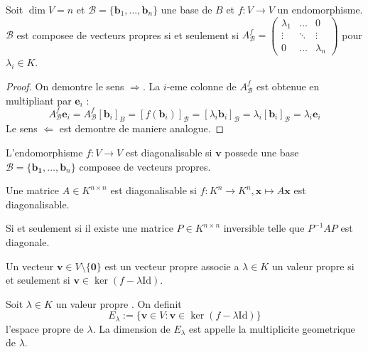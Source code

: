 \begin{lemma}
Soit $\dim V=n$ et $\mathscr{B}=\{ \boldsymbol{b}_{1},\dots,\boldsymbol{b}_{n} \}$ une base de $B$ et $f:V\to V$ un endomorphisme. $\mathscr{B}$ est composee de vecteurs propres si et seulement si $A^{f}_{\mathscr{B}}=\begin{pmatrix}\lambda_{1} & \dots & 0 \\ \vdots & \ddots & \vdots \\ 0 & \dots& \lambda _{n}\end{pmatrix}$ pour $\lambda _{i}\in K$.
\end{lemma}
\begin{proof}
On demontre le sens $\Rightarrow$. La $i$-eme colonne de $A_{\mathscr{B}}^{f}$ est obtenue en multipliant par $\boldsymbol{e}_{i}$ : $$A_{\mathscr{B}}^{f}\boldsymbol{e}_{i}=A_{\mathscr{B}}^{f}[\boldsymbol{b}_{i}]_{B}=[f(\boldsymbol{b}_{i})]_{\mathscr{B}}=[\lambda _{i}\boldsymbol{b}_{i}]_{\mathscr{B}}=\lambda _{i}[\boldsymbol{b}_{i}]_{\mathscr{B}}=\lambda _{i}\boldsymbol{e}_{i}$$
Le sens $\Leftarrow$ est demontre de maniere analogue.
\end{proof}
\begin{definition}
L'endomorphisme $f:V\to V$ est diagonalisable si $\boldsymbol{v}$ possede une base $\mathscr{B}=\{ \boldsymbol{b_{1}},\dots,\boldsymbol{b}_{n} \}$ composee de vecteurs propres.

Une matrice $A\in K^{n\times n}$ est diagonalisable si $f:K^{n}\to K^{n},\boldsymbol{x}\mapsto A\boldsymbol{x}$ est diagonalisable. 
\begin{exercise}
Si et seulement si il existe une matrice $P\in K^{n\times n}$ inversible telle que $P^{-1}AP$ est diagonale.
\end{exercise}
\end{definition}

\begin{lemma}
Un vecteur $\boldsymbol{v}\in V\setminus \{ \boldsymbol{0} \}$ est un vecteur propre associe a $\lambda \in K$ un valeur propre si et seulement si $\boldsymbol{v}\in \ker(f-\lambda \mathrm{Id})$.
\end{lemma}
\begin{definition}
Soit $\lambda \in K$ un valeur propre . On definit 
$$
E_{\lambda}:= \{ \boldsymbol{v}\in V:\boldsymbol{v}\in \ker(f-\lambda \mathrm{Id}) \}
$$
l'espace propre de $\lambda$. La dimension de $E_{\lambda}$ est appelle la multiplicite geometrique de $\lambda$.
\end{definition}

